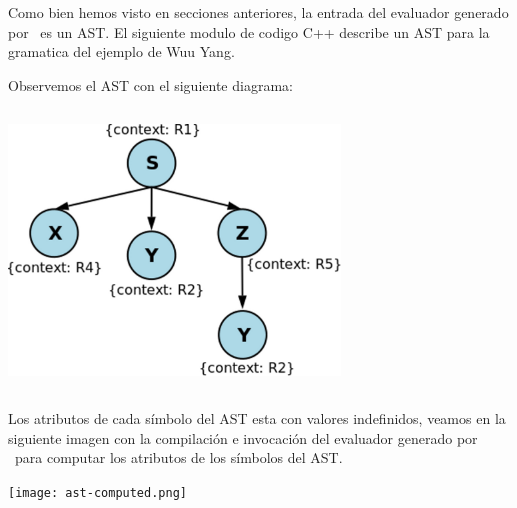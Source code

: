 Como bien hemos visto en secciones anteriores, la entrada del evaluador generado por \maggen\ es un AST. El siguiente modulo de codigo C++ describe un AST para la gramatica del ejemplo de Wuu Yang.

\tiny

\normalsize

Observemos el AST con el siguiente diagrama:
\begin{center}
\includegraphics[width=250pt,height=211pt]{ast.png}
\end{center}
Los atributos de cada símbolo del AST esta con valores indefinidos, veamos en la siguiente imagen con la compilación e invocación del evaluador generado por \maggen\ para computar los atributos de los símbolos del AST.
\begin{center}
\texttt{[image: ast-computed.png]}
\end{center} 

